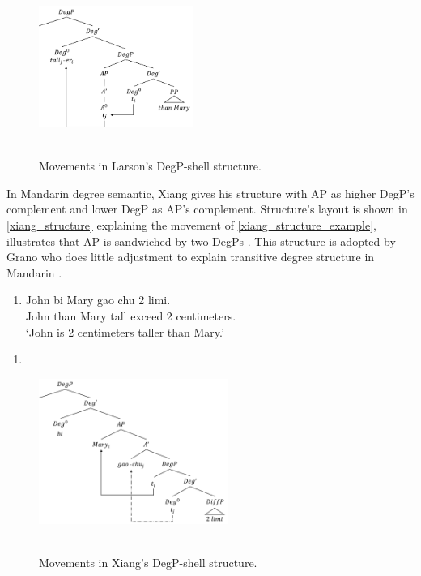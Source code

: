 \documentclass{ctexart}
\let \cite \parencite
\begin{document}
\begin{figure}[H]
    \centering
    \includegraphics[width=0.45\textwidth]{pic/larson1.png}
    \begin{caption}
        \\ \vspace{-1.1ex}
        Movements in Larson's DegP-shell structure.
    \end{caption}
\end{figure}

In Mandarin degree semantic, Xiang gives his structure with AP as higher DegP's complement and lower DegP as AP's complement. Structure's layout is shown in \ref{xiang_structure} explaining the movement of \ref{xiang_structure_example}, illustrates that AP is sandwiched by two DegPs \cite{xiang2005}. This structure is adopted by Grano who does little adjustment to explain transitive degree structure in Mandarin \cite{grano2012}. 

\begin{enumerate}
    \item \label{xiang_structure_example}
    John bi Mary gao chu 2 limi.  \\
    John than Mary tall exceed 2 centimeters. \\
    `John is 2 centimeters taller than Mary.'
\end{enumerate}

\begin{enumerate}
    \item \label{xiang_structure}
\end{enumerate}

\begin{figure}[H]
    \centering
    \includegraphics[width=0.55\textwidth]{pic/xiang.png}
    \begin{caption}
        \\ \vspace{-1.1ex}
        Movements in Xiang's DegP-shell structure.
    \end{caption}
\end{figure}
\end{document}
